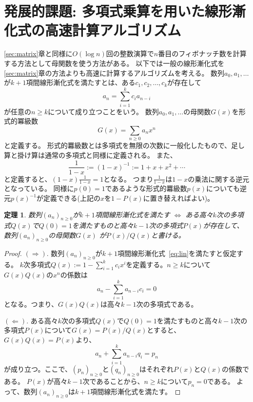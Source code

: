 \documentclass[a4paper,twoside,onecolumn,openany,article]{memoir}
\theoremstyle{plain}
\newtheorem{theorem}{定理}
\theoremstyle{remark}
\begin{document}
\section{発展的課題: 多項式乗算を用いた線形漸化式の高速計算アルゴリズム}
\ref{sec:matrix}章と同様に$O(\log n)$回の整数演算で$n$番目のフィボナッチ数を計算する方法として母関数を使う方法がある。
以下では一般の線形漸化式を\ref{sec:matrix}章の方法よりも高速に計算するアルゴリズムを考える。
数列$a_0,a_1,\dotsc$が$k+1$項間線形漸化式を満たすとは、ある$c_1,c_2,\dotsc,c_k$が存在して
\begin{equation}
a_n = \sum_{i=1}^k c_i a_{n-i}
\label{eq:lin}
\end{equation}
が任意の$n\ge k$について成り立つことをいう。
数列$a_0,a_1,\dotsc$の母関数$G(x)$を形式的冪級数
\begin{equation*}
G(x)=\sum_{n\ge 0} a_n x^n
\end{equation*}
と定義する。
形式的羃級数とは多項式を無限の次数に一般化したもので、足し算と掛け算は通常の多項式と同様に定義される。
また、
\begin{equation*}
\frac1{1-x} := (1-x)^{-1} := 1+x+x^2+\dotsb
\end{equation*}
と定義すると、$(1-x) \frac1{1-x} = 1$となる。
つまり$\frac1{1-x}$は$1-x$の乗法に関する逆元となっている。
同様に$p(0)= 1$であるような形式的羃級数$p(x)$についても逆元$p(x)^{-1}$が定義できる(上記の$x$を$1-P(x)$に置き替えればよい)。
\begin{theorem}\label{thm:lin}
数列$(a_n)_{n\ge 0}$が$k+1$項間線形漸化式を満たす $\iff$ ある高々$k$次の多項式$Q(x)$で$Q(0)=1$を満たすものと高々$k-1$次の多項式$P(x)$が存在して、数列$(a_n)_{n\ge 0}$の母関数$G(x)$
が$P(x)/Q(x)$と書ける。
\end{theorem}
\begin{proof}
$(\Rightarrow).$
数列$(a_n)_{n\ge 0}$が$k+1$項間線形漸化式~\eqref{eq:lin}を満たすと仮定する。
$k$次多項式$Q(x):=1-\sum_{i=1}^k c_i x^i$を定義する。$n\ge k$について$G(x)Q(x)$の$x^n$の係数は
\begin{equation*}
a_n - \sum_{i=1}^k a_{n-i} c_i = 0
\end{equation*}
となる。つまり、$G(x)Q(x)$は高々$k-1$次の多項式である。

$(\Leftarrow).$
ある高々$k$次の多項式$Q(x)$で$Q(0)=1$を満たすものと高々$k-1$次の多項式$P(x)$について$G(x)=P(x)/Q(x)$とすると、$G(x)Q(x)=P(x)$より、
\begin{equation*}
a_n + \sum_{i=1}^k a_{n-i} q_i = p_n
\end{equation*}
が成り立つ。ここで、$(p_n)_{n\ge 0}$と$(q_n)_{n\ge 0}$はそれぞれ$P(x)$と$Q(x)$の係数である。
$P(x)$が高々$k-1$次であることから、$n\ge k$について$p_n=0$である。
よって、数列$(a_n)_{n\ge 0}$は$k+1$項間線形漸化式を満たす。
\end{proof}
\end{document}
